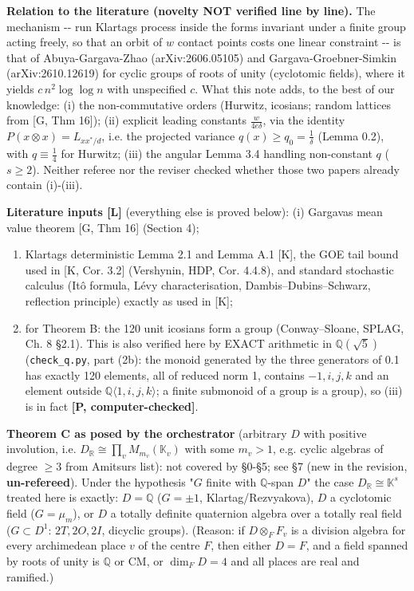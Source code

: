 \textbf{Relation to the literature (novelty NOT verified line by line).} The mechanism -\/- run Klartag\textquotesingle s process inside the forms invariant under a finite group acting freely, so that an orbit of \(w\) contact points costs one linear constraint -\/- is that of Abuya-Gargava-Zhao (arXiv:2606.05105) and Gargava-Groebner-Simkin (arXiv:2610.12619) for cyclic groups of roots of unity (cyclotomic fields), where it yields \(c\,n^2\log\log n\) with unspecified \(c\). What this note adds, to the best of our knowledge: (i) the non-commutative orders (Hurwitz, icosians; random lattices from {[}G, Thm 16{]}); (ii) explicit leading constants \(\frac{w}{4e\delta}\), via the identity \(P(x\otimes x)=L_{xx^*/d}\), i.e. the projected variance \(q(x)\ge q_0=\frac1\delta\) (Lemma 0.2), with \(q\equiv\frac14\) for Hurwitz; (iii) the angular Lemma 3.4 handling non-constant \(q\) (\(s\ge2\)). Neither referee nor the reviser checked whether those two papers already contain (i)-(iii).

\textbf{Literature inputs {[}L{]}} (everything else is proved below): (i) Gargava\textquotesingle s mean value theorem {[}G, Thm 16{]} (Section 4);

\begin{enumerate}
\def\labelenumi{(\roman{enumi})}
\setcounter{enumi}{1}
\tightlist
\item
  Klartag\textquotesingle s deterministic Lemma 2.1 and Lemma A.1 {[}K{]}, the GOE tail bound used in {[}K, Cor. 3.2{]} (Vershynin, HDP, Cor. 4.4.8),
  and standard stochastic calculus (Itô formula, Lévy characterisation, Dambis--Dubins--Schwarz, reflection principle) exactly as used in {[}K{]};
\item
  for Theorem B: the 120 unit icosians form a group (Conway--Sloane, SPLAG, Ch. 8 §2.1). This is also verified here by EXACT arithmetic in \(\mathbb Q(\sqrt5)\) (\texttt{check\_q.py}, part (2b): the monoid generated by the three generators of 0.1 has exactly 120 elements, all of reduced norm 1, contains \(-1,i,j,k\) and an element outside \(\mathbb Q\langle1,i,j,k\rangle\); a finite submonoid of a group is a group), so (iii) is in fact \textbf{{[}P, computer-checked{]}}.
\end{enumerate}

\textbf{Theorem C as posed by the orchestrator} (arbitrary \(D\) with positive involution, i.e. \(D_{\mathbb R}\cong\prod_v M_{m_v}(\mathbb K_v)\) with some \(m_v>1\),
e.g. cyclic algebras of degree \(\ge3\) from Amitsur\textquotesingle s list): not covered by §0-§5; see §7 (new in the revision, \textbf{un-refereed}). Under the hypothesis "\(G\) finite with \(\mathbb Q\)-span \(D\)"
the case \(D_\mathbb R\cong \mathbb K^s\) treated here is exactly: \(D=\mathbb Q\) (\(G=\pm1\), Klartag/Rezvyakova), \(D\) a cyclotomic field (\(G=\mu_m\)), or \(D\) a totally
definite quaternion algebra over a totally real field (\(G\subset D^1\): \(2T,2O,2I\), dicyclic groups). (Reason: if \(D\otimes_F F_v\) is a division algebra for every
archimedean place \(v\) of the centre \(F\), then either \(D=F\), and a field spanned by roots of unity is \(\mathbb Q\) or CM, or \(\dim_FD=4\) and all places are real and ramified.)

